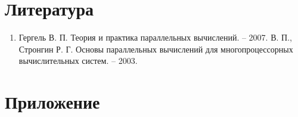 \documentclass{report}
\begin{document}
\section*{Литература}
\begin{enumerate}
\item Гергель В. П. Теория и практика параллельных вычислений. – 2007.
 В. П., Стронгин Р. Г. Основы параллельных вычислений для многопроцессорных вычислительных систем. – 2003.

\end{enumerate} 
\newpage

\section*{Приложение}
\end{document}
